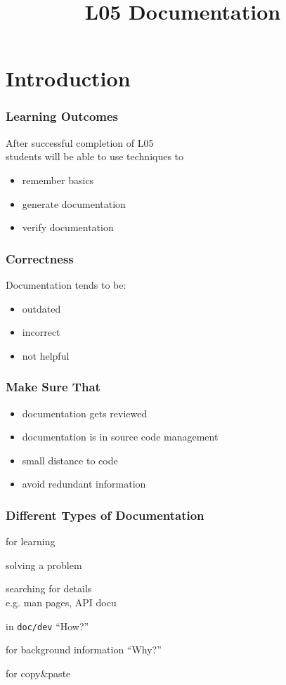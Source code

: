

\title{L05 Documentation}



\section{Introduction}

\begin{frame}
	\frametitle{Learning Outcomes}
	After successful completion of L05 \\
	students will be able to
	use techniques to

	\begin{itemize}
	\item remember basics
	\item generate documentation
	\item verify documentation
	\end{itemize}
\end{frame}

\begin{frame}
	\frametitle{Correctness}

	Documentation tends to be:

	\begin{itemize}[<+-| alert@+>]
	\item outdated
	\item incorrect
	\item not helpful
	\end{itemize}
\end{frame}

\begin{frame}
	\frametitle{Make Sure That}

	\begin{itemize}[<+-| alert@+>]
	\item documentation gets reviewed
	\item documentation is in source code management
	\item small distance to code
	\item avoid redundant information
	\end{itemize}
\end{frame}

\begin{frame}
	\frametitle{Different Types of Documentation}

	\begin{description}[<+-| alert@+>]
	\item[tutorials] for learning
	\item[how-to] solving a problem
	\item[reference] searching for details \\ e.g. man pages, API docu
	\item[explanations] in \texttt{doc/dev} ``How?''
	\item[decisions] for background information ``Why?''
	\item[examples] for copy\&paste
	\end{description}
\end{frame}

